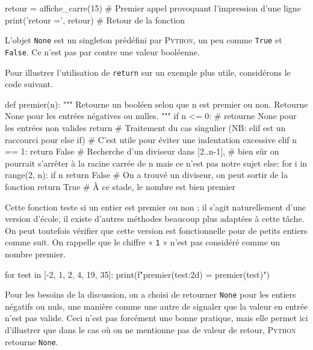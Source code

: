 \begin{idleconsole*}
\begin{pyconsole}
retour = affiche_carre(15) # Premier appel provoquant l'impression d'une ligne
print('retour =', retour)  # Retour de la fonction
\end{pyconsole}
\end{idleconsole*}

L'objet \texttt{None} est un singleton prédéfini par \textsc{Python}, un peu comme \texttt{True} et \texttt{False}. Ce n'est pas par contre une valeur booléenne.

Pour illustrer l'utilisation de \texttt{return} sur un exemple plus utile, considérons le code suivant.

\begin{idleconsole*}
\begin{pyconsole}
def premier(n):
    """
    Retourne un booléen selon que n est premier ou non.
    Retourne None pour les entrées négatives ou nulles.
    """
    if n <= 0: # retourne None pour les entrées non valides
        return
    # Traitement du cas singulier (NB: elif est un raccourci pour else if)
    # C'est utile pour éviter une indentation excessive
    elif n == 1:
        return False
    # Recherche d'un diviseur dans [2..n-1],
    # bien sûr on pourrait s'arrêter à la racine carrée de n mais ce n'est pas notre sujet
    else:
        for i in range(2, n):
            if n %
                return False # On a trouvé un diviseur, on peut sortir de la fonction
    return True # À ce stade, le nombre est bien premier

\end{pyconsole}
\end{idleconsole*}

Cette fonction teste si un entier est premier ou non ; il s'agit naturellement d'une version d'école, il existe d'autres méthodes beaucoup plus adaptées à cette tâche. On peut toutefois vérifier que cette version est fonctionnelle pour de petits entiers comme suit. On rappelle que le chiffre « \texttt{1} » n'est pas considéré comme un nombre premier.

\begin{idleconsole}
\begin{pyconsole}
for test in [-2, 1, 2, 4, 19, 35]:
    print(f"premier({test:2d}) = {premier(test)}")

\end{pyconsole}
\end{idleconsole}

Pour les besoins de la discussion, on a choisi de retourner \texttt{None} pour les entiers négatifs ou nuls, une manière comme une autre de signaler que la valeur en entrée n'est pas valide. Ceci n'est pas forcément une bonne pratique, mais elle permet ici d'illustrer que dans le cas où on ne mentionne pas de valeur de retour, \textsc{Python} retourne \texttt{None}.

